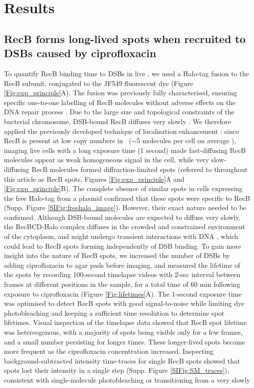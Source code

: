 \section*{Results}

\subsection*{RecB forms long-lived spots when recruited to DSBs caused by cipro\-floxacin}
To quantify RecB binding time to DSBs in live \ecoli, we used a Halo-tag fusion to the RecB subunit, conjugated to the JF549 fluorescent dye (Figure \ref{Fig:exp_principle}A). The fusion was previously fully characterised, ensuring specific one-to-one labelling of RecB molecules without adverse effects on the DNA repair process \cite{Lepore2019a,Lepore2023}. Due to the large size and topological constraints of the bacterial chromosome, DSB-bound RecB diffuses very slowly \cite{Lepore2023}. We therefore applied the previously developed technique of localisation enhancement \cite{Yu2006, Elf2007}: since RecB is present at low copy numbers in \ecoli\ ($\sim$5 molecules per cell on average \cite{Lepore2019a,Kalita2024}), imaging live cells with a long exposure time (1 second) made fast-diffusing RecB molecules appear as weak homogeneous signal in the cell, while very slow-diffusing RecB molecules formed diffraction-limited spots (referred to throughout this article as RecB spots, Figures \ref{Fig:exp_principle}A and \ref{Fig:exp_principle}B). The complete absence of similar spots in cells expressing the free Halo-tag from a plasmid confirmed that these spots were specific to RecB (Supp. Figure \ref{SIFig:freehalo_image}). However, their exact nature needed to be confirmed. Although DSB-bound molecules are expected to diffuse very slowly, the RecBCD-Halo complex diffuses in the crowded and constrained environment of the cytoplasm, and might undergo transient interactions with DNA \cite{Lepore2023}, which could lead to RecB spots forming independently of DSB binding. To gain more insight into the nature of RecB spots, we increased the number of DSBs by adding ciprofloxacin to agar pads before imaging, and measured the lifetime of the spots by recording 100-second timelapse videos with 2-sec interval between frames at different positions in the sample, for a total time of 60 min following exposure to ciprofloxacin (Figure \ref{Fig:lifetimes}A). The 1-second exposure time was optimised to detect RecB spots with good signal-to-noise while limiting dye photobleaching and keeping a sufficient time resolution to determine spot lifetimes. Visual inspection of the timelapse data showed that RecB spot lifetime was hetereogenous, with a majority of spots being visible only for a few frames, and a small number persisting for longer times. These longer-lived spots became more frequent as the ciprofloxacin concentration increased. Inspecting background-subtracted intensity time-traces for single RecB spots showed that spots lost their intensity in a single step (Supp. Figure \ref{SIFig:SM_traces}), consistent with single-molecule photobleaching or transitioning from a very slowly 